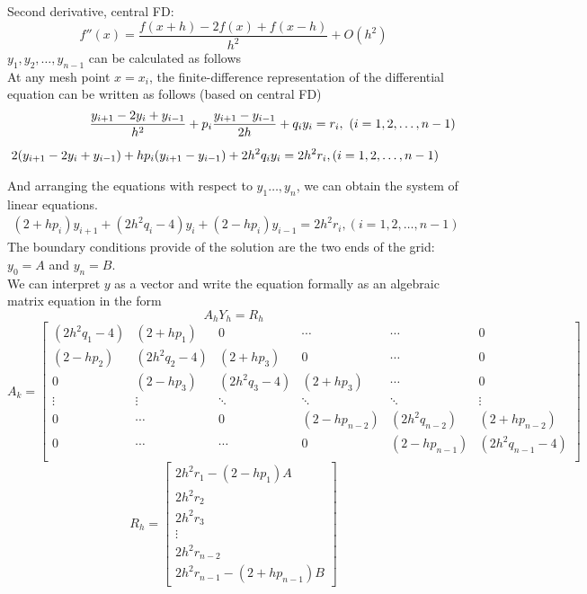 \documentclass[12pt]{report}
\newcommand{\sps}{\\[0.2cm]}
\newcommand{\dprime}{''}
\begin{document}
	Second derivative, central FD:
	\begin{equation}
		f\dprime(x) = \frac{f(x+h) - 2f(x) + f(x-h)}{h^2} + O(h^2)\label{eq:3_5}
	\end{equation}
	$y_1, y_2,\ldots, y_{n-1}$ can be calculated as follows\sps
	At any mesh point $x=x_i$, the finite-difference representation of the differential equation can be written as follows (based on central FD)
	\begin{eqnarray}
		\frac{y_{i+1} - 2y_i + y_{i-1}}{h^2} + p_i\frac{y_{i+1}-y_{i-1}}{2h}+ q_iy_i = r_i, ~ (i=1,2,\ldots,n-1)\notag \sps
		2(y_{i+1}-2y_i + y_{i-1})+ hp_i(y_{i+1} - y_{i-1}) + 2h^2q_iy_i = 2h^2r_i,  (i=1,2,\ldots,n-1)~~~~\label{eq:3_6}
	\end{eqnarray}
	
	And arranging the equations with respect to $y_1\ldots,y_n$, we can obtain the system of linear equations.
	\begin{eqnarray}
		(2+hp_i)y_{i+1} + (2h^2q_i - 4)y_i + (2-hp_i)y_{i-1} = 2h^2r_i, (i=1,2,\ldots,n-1)~~~\label{eq:3_7}
	\end{eqnarray}
	The boundary conditions provide of the solution are the two ends of the grid: $y_0=A$ and $y_n=B$.\sps
	We can interpret $y$ as a vector and write the equation formally as an algebraic matrix equation in the form
	\begin{equation}
		A_hY_h = R_h \label{eq:3_8}
	\end{equation}
	\begin{equation*}
		A_k = 
		\begin{bmatrix}
			(2h^2q_1-4) & (2+hp_1) & 0 & \cdots & \cdots & 0\\
			(2-hp_2) & (2h^2q_2 - 4) & (2+hp_3) & 0 & \cdots & 0\\
			0 & (2-hp_3) & (2h^2q_3 - 4) & (2+hp_3) & \cdots & 0 \\
			\vdots & \vdots & \ddots & \ddots & \ddots & \vdots \\
			0 & \cdots & 0 & (2-hp_{n-2}) & (2h^2q_{n-2}) & (2+hp_{n-2})\\
			0 & \cdots & \cdots & 0 & (2-hp_{n-1}) & (2h^2q_{n-1}-4) \\
		\end{bmatrix}
	\end{equation*}
	\begin{equation*}
		R_h = 
		\begin{bmatrix}
			2h^2r_1-(2-hp_1)A\\
			2h^2r_2\\
			2h^2r_3\\
			\vdots\\
			2h^2r_{n-2}\\
			2h^2r_{n-1}-(2+hp_{n-1})B
		\end{bmatrix}
	\end{equation*}
\end{document}
